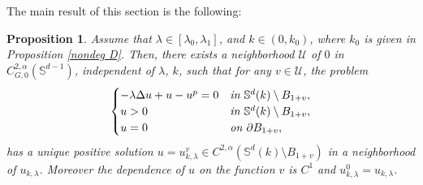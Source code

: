 \documentclass[reqno]{amsart}
\newtheorem{proposition}[theorem]{Proposition}
\numberwithin{equation}{section}
\newenvironment{key words}{\textbf{Keywords}\mbox{  }}{ }
\begin{document}
\medskip The main result of this section is the following:

\begin{proposition} \label{Pr30}
	Assume that $\lambda\in[\lambda_{0},\lambda_{1}]$, and $k \in (0, k_0)$, where $k_0$ is given in Proposition \ref{nondeg D}. Then, there exists a neighborhood $\mathcal{U}$ of $0$ in $ C_{G,0}^{2,\alpha}(\mathbb{S}^{d-1})$, independent of $\lambda$, $k$, such that for any $v \in \mathcal{U}$, the problem
	\begin{equation}\label{eq31}
	\begin{cases}
	-\lambda\Delta u+u-u^{p} =0&\emph{in $\mathbb{S}^{d}(k)\setminus B_{1+v}$},\\
	u>0 & \emph{in $\mathbb{S}^{d}(k)\setminus B_{1+v}$}, \\
	u=0 &\emph{on $\partial B_{1+v}$},
	\end{cases}
	\end{equation}
	has a unique positive solution $u=u_{k, \lambda}^v\in C^{2,\alpha}(\mathbb{S}^{d}(k)\setminus B_{1+v})$ in a neighborhood of $u_{k, \lambda}$.  %
	Moreover the dependence of $u$ on the function $v$ is $C^1$ and $u_{k, \lambda}^0=u_{k, \lambda}$.
\end{proposition}
\end{document}
